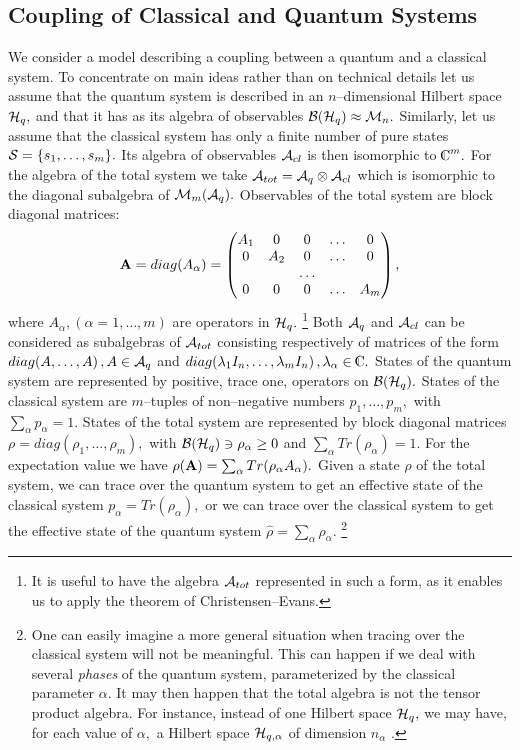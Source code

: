 \documentclass[12pt]{article}
\def\complex{{\kern .1em {\raise .47ex \hbox
{$\scriptscriptstyle
|$}}
\kern -.4em {\rm C}}}
\begin{document}
\subsection{Coupling of Classical and Quantum Systems}
We consider a model describing a coupling between a quantum and
a classical system.  To concentrate on main ideas rather than on
technical details let us assume that the quantum system is described in
an $n$--dimensional Hilbert space ${\cal H}_q , $ and that it has as its
algebra of observables ${\cal B} ({\cal H}_q) \approx {\cal M}_n . $ Similarly, 
let us assume that the classical system has only a finite number of pure
states ${\cal S}=\{ s_1, \ldots , s_m\} . $ Its algebra of observables
${\cal A}_{cl}$ is then isomorphic to $\complex^m . $ For the algebra
of the total system we take
${\cal A}_{tot}={\cal A}_q \otimes {\cal A}_{cl}$ which is isomorphic to the
diagonal subalgebra of ${\cal M}_m  ({\cal A}_q) . $ Observables of the total
system are block diagonal matrices: 
$${\bf A}=diag (A_{\alpha}) = \begin{pmatrix}
A_1&0&0&\ldots&0\cr
0&A_2&0&\ldots&0\cr
&&\ldots&&\cr
0&0&0&\ldots&A_m\cr\end{pmatrix}, $$
where $A_{\alpha},   (\alpha=1, \ldots , m)$ are operators in ${\cal H}_q
. $%
\footnote{It is useful to have the algebra  ${\cal A}_{tot}$
represented in such a form, as it enables us to apply the
theorem of Christensen--Evans.}
Both ${\cal A}_q$ and ${\cal A}_{cl}$ can be considered as
subalgebras  of ${\cal A}_{tot}$ consisting respectively of matrices
of the form
$diag (A, \ldots, A)\,  ,  A\in {\cal A}_q$ and $diag (\lambda_1
I_n, \ldots, \lambda_m I_n)\,  ,  \lambda_{\alpha}\in\complex . $ 
States of the quantum system are represented by positive,  trace one,  
operators on
${\cal B} ({\cal H}_q) . $ States of the classical system are
$m$--tuples of non--negative numbers $p_1, \ldots, p_m , $  with
$\sum_{\alpha} p_{\alpha}=1. $ States of the total system are
represented by block diagonal matrices
$ \rho =diag (\rho_1, \ldots, \rho_m) , $ with ${\cal B} ({\cal
H}_q)\ni \rho_{\alpha}\geq 0$ and $\sum_{\alpha} Tr (\rho_{\alpha})=1
. $ For the expectation value we have  $\rho  ({\bf A}) =\sum_{\alpha}
Tr (\rho_\alpha A_\alpha ) . $ Given a state $\rho$ of the total
system,  we can trace over the quantum system to get an effective state
of the classical system
$p_\alpha =Tr (\rho_\alpha ) ,  $ or we can trace over the classical
system to get the effective state of the quantum system
${\hat\rho}=\sum_\alpha\rho_\alpha . $%
\footnote{One can easily imagine a more general situation when
tracing over the classical system will not be meaningful.  This can
happen if we deal with several {\em phases} of the quantum system, 
parameterized by the classical parameter $\alpha$.  It may then happen
that the total algebra is not the  tensor product algebra.  For
instance,  instead of one Hilbert space ${\cal H}_q , $ we may have, 
for each value of $\alpha , $ a Hilbert space ${\cal H}_{q, \alpha}$ 
of dimension $n_\alpha$ . }
\end{document}
